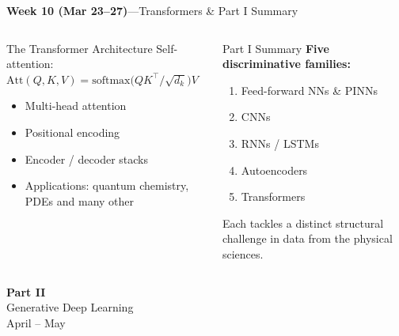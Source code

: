 \documentclass[aspectratio=169,11pt]{beamer}
\begin{document}
\begin{frame}{{\color{mlgold}\textbf{Week 10 (Mar 23--27)}\;---\;Transformers \& Part I Summary}}
  \begin{columns}[T]
      \begin{block}{The Transformer Architecture}
        Self-attention: $\mathrm{Att}(Q,K,V)
          =\mathrm{softmax}\!\bigl(QK^\top/\!\sqrt{d_k}\bigr)V$
        \begin{itemize}\itemsep1pt
          \item Multi-head attention
          \item Positional encoding
          \item Encoder / decoder stacks
          \item Applications: quantum chemistry, PDEs and many other
        \end{itemize}
      \end{block}
      \begin{alertblock}{Part I Summary}
        \textbf{Five discriminative families:}
        \begin{enumerate}\itemsep1pt
          \item Feed-forward NNs \& PINNs
          \item CNNs
          \item RNNs / LSTMs
          \item Autoencoders
          \item Transformers
        \end{enumerate}
        Each tackles a distinct structural
        challenge in  data from the physical sciences.
      \end{alertblock}
  \end{columns}
\end{frame}

\begin{frame}[plain]
  \begin{center}
    \vspace{1.6cm}
    {\Huge\bfseries\color{mlcoral} Part II}\\[0.5em]
    {\Large\color{mldark} Generative Deep Learning}\\[0.35em]
    {\normalsize\color{gray} April -- May}
  \end{center}
\end{frame}
\end{document}
